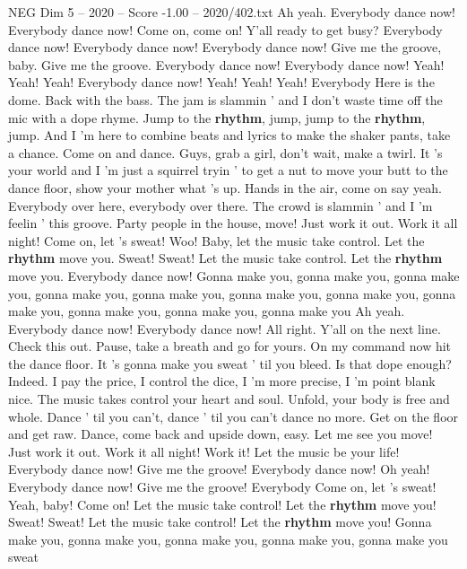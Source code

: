 \begin{textsample}{NEG Dim 5 – 2020 – Score -1.00 – 2020/402.txt}  \label{ex:f5_neg_030}
Ah yeah.
Everybody dance now!
Everybody dance now!
Come on, come on!
Y'all ready to get busy?
Everybody dance now!
Everybody dance now!
Everybody dance now!
Give me the groove, baby.
Give me the groove.
Everybody dance now!
Everybody dance now!
Yeah!
Yeah!
Yeah!
Everybody dance now!
Yeah!
Yeah!
Yeah!
Everybody Here is the dome.
Back with the bass.
The jam is slammin ' and I don't waste time off the mic with a dope rhyme.
Jump to the \textbf{rhythm}, jump, jump to the \textbf{rhythm}, jump.
And I 'm here to combine beats and lyrics to make the shaker pants, take a chance.
Come on and dance.
Guys, grab a girl, don't wait, make a twirl.
It 's your world and I 'm just a squirrel tryin ' to get a nut to move your butt to the dance floor, show your mother what 's up.
Hands in the air, come on say yeah.
Everybody over here, everybody over there.
The crowd is slammin ' and I 'm feelin ' this groove.
Party people in the house, move!
Just work it out.
Work it all night!
Come on, let 's sweat!
Woo!
Baby, let the music take control.
Let the \textbf{rhythm} move you.
Sweat!
Sweat!
Let the music take control.
Let the \textbf{rhythm} move you.
Everybody dance now!
Gonna make you, gonna make you, gonna make you, gonna make you, gonna make you, gonna make you, gonna make you, gonna make you, gonna make you, gonna make you, gonna make you Ah yeah.
Everybody dance now!
Everybody dance now!
All right.
Y'all on the next line.
Check this out.
Pause, take a breath and go for yours.
On my command now hit the dance floor.
It 's gonna make you sweat ' til you bleed.
Is that dope enough?
Indeed.
I pay the price, I control the dice, I 'm more precise, I 'm point blank nice.
The music takes control your heart and soul.
Unfold, your body is free and whole.
Dance ' til you can't, dance ' til you can't dance no more.
Get on the floor and get raw.
Dance, come back and upside down, easy.
Let me see you move!
Just work it out.
Work it all night!
Work it!
Let the music be your life!
Everybody dance now!
Give me the groove!
Everybody dance now!
Oh yeah!
Everybody dance now!
Give me the groove!
Everybody Come on, let 's sweat!
Yeah, baby!
Come on!
Let the music take control!
Let the \textbf{rhythm} move you!
Sweat!
Sweat!
Let the music take control!
Let the \textbf{rhythm} move you!
Gonna make you, gonna make you, gonna make you, gonna make you, gonna make you sweat

\end{textsample}
